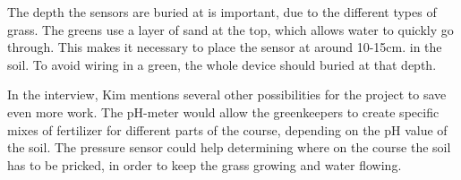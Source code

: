 The depth the sensors are buried at is important, due to the different types of grass. The greens use a layer of sand at the top, which allows water to quickly go through. This makes it necessary to place the sensor at around 10-15cm. in the soil. To avoid wiring in a green, the whole device should buried at that depth.

In the interview, Kim mentions several other possibilities for the project to save even more work. The pH-meter would allow the greenkeepers to create specific mixes of fertilizer for different parts of the course, depending on the pH value of the soil. The pressure sensor could help determining where on the course the soil has to be pricked, in order to keep the grass growing and water flowing.